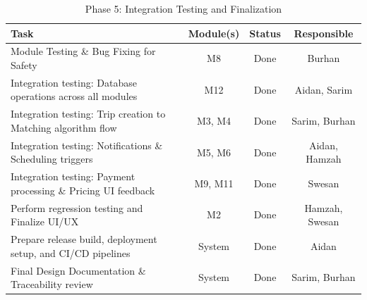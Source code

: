 \begin{table}[h!]
  \centering
  \caption{Phase 5: Integration Testing and Finalization}
  \begin{tabularx}{\textwidth}{|X|c|c|c|}
  \hline
  \textbf{Task} & \textbf{Module(s)} & \textbf{Status} & \textbf{Responsible} \\
  \hline

  Module Testing \& Bug Fixing for Safety  
  & M8 & Done & Burhan \\
  \hline

  Integration testing: Database operations across all modules
  & M12 & Done & Aidan, Sarim \\
  \hline

  Integration testing: Trip creation to Matching algorithm flow
  & M3, M4 & Done & Sarim, Burhan \\
  \hline

  Integration testing: Notifications \& Scheduling triggers
  & M5, M6 & Done & Aidan, Hamzah \\
  \hline

  Integration testing: Payment processing \& Pricing UI feedback
  & M9, M11 & Done & Swesan \\
  \hline

  Perform regression testing and Finalize UI/UX 
  & M2 & Done & Hamzah, Swesan \\
  \hline

  Prepare release build, deployment setup, and CI/CD pipelines
  & System & Done & Aidan \\
  \hline
  
  Final Design Documentation \& Traceability review
  & System & Done & Sarim, Burhan \\
  \hline

  \end{tabularx}
\end{table}
    

\clearpage




\newpage{}

